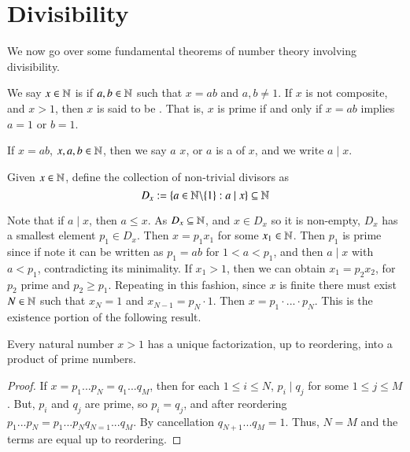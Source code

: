 \section{Divisibility}

We now go over some fundamental theorems of number theory involving divisibility.

\begin{definition}
    We say $x \in \mathbb N$ is  if $a,b \in \mathbb N$ such that $x = ab$ and $a,b \neq 1$. If $x$ is not composite, and $x > 1$, then $x$ is said to be . That is, $x$ is prime if and only if $x = ab$ implies $a = 1$ or $b =1$.
\end{definition}

\begin{definition}
    If $x = ab$, $x,a,b \in \mathbb N$, then we say $a$  $x$, or $a$ is a  of $x$, and we write $a\;\vert\;x$.
\end{definition}

\begin{definition}
    Given $x \in \mathbb N$, define the collection of non-trivial divisors as $$D_x := \{a \in \mathbb N\backslash\{1\}:a\;\vert\;x\} \subseteq \mathbb N$$
\end{definition}

Note that if $a \;\vert\;x$, then $a \leq x$. As $D_x \subseteq \mathbb N$, and $x \in D_x$ so it is non-empty, $D_x$ has a smallest element $p_1 \in D_x$. Then $x = p_1x_1$ for some $x_1 \in \mathbb N$. Then $p_1$ is prime since if note it can be written as $p_1 = ab$ for $1 < a < p_1$, and then $a\;\vert\;x$ with $a < p_1$, contradicting its minimality. If $x_1 > 1$, then we can obtain $x_1 = p_2x_2$, for $p_2$ prime and $p_2 \geq p_1$. Repeating in this fashion, since $x$ is finite there must exist $N \in \mathbb N$ such that $x_N = 1$ and $x_{N-1} = p_N\cdot 1$. Then $x = p_1\cdot ...\cdot p_N$. This is the existence portion of the following result.

\begin{theorem}
    Every natural number $x > 1$ has a unique factorization, up to reordering, into a product of prime numbers.
\end{theorem}
\begin{proof}
    If $x = p_1...p_N = q_1...q_M$, then for each $1 \leq i\leq N$, $p_i\;\vert\;q_j$ for some $1 \leq j \leq M$. But, $p_i$ and $q_j$ are prime, so $p_i = q_j$, and after reordering $p_1 ...p_N = p_1...p_Nq_{N=1}...q_M$. By cancellation $q_{N+1}...q_M = 1$. Thus, $N = M$ and the terms are equal up to reordering.
\end{proof}


